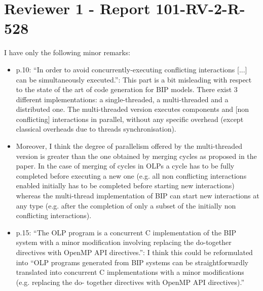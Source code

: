 \section{Reviewer 1 - Report 101-RV-2-R-528}
I have only the following minor remarks:

\begin{itemize}
\item p.10: ``In order to avoid concurrently-executing conflicting interactions [...] can be simultaneously 
executed.'': This part is a bit misleading with respect to the state of the art of code generation for BIP 
models. There exist 3 different implementations: a single-threaded, a multi-threaded and a distributed 
one. The multi-threaded version executes components and [non conflicting] interactions in parallel, 
without any specific overhead (except classical overheads due to threads synchronisation).

\item Moreover, I think the degree of parallelism offered by the multi-threaded version is greater than the 
one obtained by merging cycles as proposed in the paper. In the case of merging of cycles in OLPs a 
cycle has to be fully completed before executing a new one (e.g. all non conflicting interactions 
enabled initially has to be completed before starting new interactions) whereas the multi-thread 
implementation of BIP can start new interactions at any type (e.g. after the completion of only a 
subset of the initially non conflicting interactions).

\item p.15: ``The OLP program is a concurrent C implementation of the BIP system with a minor 
modification involving replacing the do-together directives with OpenMP API directives.'': I think this 
could be reformulated into ``OLP programs generated from BIP systems can be straightforwardly 
translated into concurrent C implementations with a minor modifications (e.g. replacing the do-
together directives with OpenMP API directives).''

\done 

\end{itemize}
